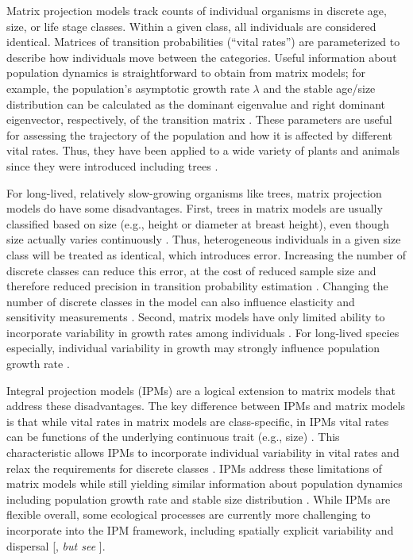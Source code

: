 \documentclass[
11pt, %
a4paper, %
oneside, %
headinclude,footinclude, %
]{scrartcl}
\begin{document}
Matrix projection models track counts of individual organisms in discrete age, size, or life stage classes.  Within a given class, all individuals are considered identical. Matrices of transition probabilities (“vital rates”) are parameterized to describe how individuals move between the categories. Useful information about population dynamics is straightforward to obtain from matrix models; for example, the population’s asymptotic growth rate $\lambda$ and the stable age/size distribution can be calculated as the dominant eigenvalue and right dominant eigenvector, respectively, of the transition matrix \citep{Caswell2001}. These parameters are useful for assessing the trajectory of the population and how it is affected by different vital rates. Thus, they have been applied to a wide variety of plants and animals since they were introduced \citep{Leslie1945} including trees \citep{Liang2013}.

For long-lived, relatively slow-growing organisms like trees, matrix projection models do have some disadvantages. First, trees in matrix models are usually classified based on size (e.g., height or diameter at breast height), even though size actually varies continuously \citep{Zuidema2010}. Thus, heterogeneous individuals in a given size class will be treated as identical, which introduces error. Increasing the number of discrete classes can reduce this error, at the cost of reduced sample size and therefore reduced precision in transition probability estimation \citep{Ellner2006}. Changing the number of discrete classes in the model can also influence elasticity and sensitivity measurements \citep{Enright1995}. Second, matrix models have only limited ability to incorporate variability in growth rates among individuals \citep{Zuidema2010}. For long-lived species especially, individual variability in growth may strongly influence population growth rate \citep{Zuidema2009}.

Integral projection models (IPMs) are a logical extension to matrix models that address these disadvantages. The key difference between IPMs and matrix models is that while vital rates in matrix models are class-specific, in IPMs vital rates can be functions of the underlying continuous trait (e.g., size) \citep{Coulson2012}. This characteristic allows IPMs to incorporate individual variability in vital rates and relax the requirements for discrete classes \citep{Zuidema2010}. IPMs address these limitations of matrix models while still yielding similar information about population dynamics including population growth rate and stable size distribution \citep{Ellner2006}. While IPMs are flexible overall, some ecological processes are currently more challenging to incorporate into the IPM framework, including spatially explicit variability and dispersal [\citealp{Jongejans2008, Adler2010}, \textit{but see} \citealp{Jongejans2011}].  
 
\end{document}
